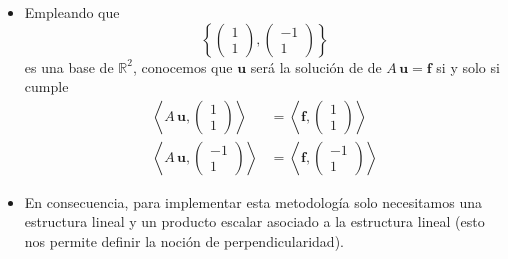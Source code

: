 \documentclass[10pt,handout]{beamer}
\theoremstyle{plain} %
\theoremstyle{plain} %
\theoremstyle{plain} %
\theoremstyle{plain} %
\theoremstyle{definition}
\theoremstyle{example}
\theoremstyle{example}
\theoremstyle{remark}
\theoremstyle{remark}
\begin{document}
\begin{frame}
\begin{itemize}
\item Empleando que $$\left\{
\left(
\begin{array}{c}
1 \\ 
1
\end{array}
\right), \left(
\begin{array}{r}
-1 \\ 
1
\end{array}
\right)
\right\} $$ es una base de $\mathbb{R}^2$, conocemos que $\mathbf{u}$ será la solución de de $A\, \mathbf{u} = \mathbf{f}$
si y solo si cumple
\begin{align*}
\left\langle A \, \mathbf{u},  \left(
\begin{array}{c}
1 \\ 
1
\end{array}
\right)\right\rangle & = \left\langle \mathbf{f},  \left(
\begin{array}{c}
1 \\ 
1
\end{array}
\right)\right\rangle \\ 
\left\langle A \, \mathbf{u},  \left(
\begin{array}{r}
-1 \\ 
1
\end{array}
\right)\right\rangle & = \left\langle \mathbf{f},  \left(
\begin{array}{r}
-1 \\ 
1
\end{array}
\right)\right\rangle
\end{align*}
\item En consecuencia, para implementar esta metodología solo necesitamos una estructura lineal y un producto escalar asociado a la estructura lineal (esto nos permite definir la noción de perpendicularidad).
\end{itemize}
\end{frame}
\end{document}
